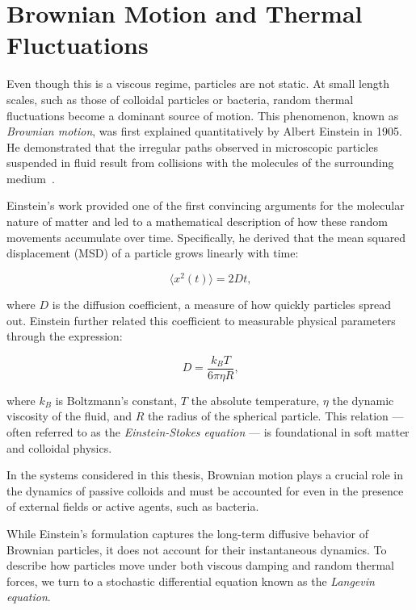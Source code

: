 \section{Brownian Motion and Thermal Fluctuations}
\label{st:brownianmotion}

Even though this is a viscous regime, particles are not static. At small length scales, such as those of colloidal particles or bacteria, random thermal fluctuations become a dominant source of motion. This phenomenon, known as \textit{Brownian motion}, was first explained quantitatively by Albert Einstein in 1905. He demonstrated that the irregular paths observed in microscopic particles suspended in fluid result from collisions with the molecules of the surrounding medium~\cite{einstein1906theory}.

Einstein's work provided one of the first convincing arguments for the molecular nature of matter and led to a mathematical description of how these random movements accumulate over time. Specifically, he derived that the mean squared displacement (MSD) of a particle grows linearly with time:

\begin{equation}
  \langle x^2(t) \rangle = 2Dt\text{,}
  \label{eq:msd}
\end{equation}

where $D$ is the diffusion coefficient, a measure of how quickly particles spread out. Einstein further related this coefficient to measurable physical parameters through the expression:

\begin{equation}
  D = \frac{k_{B}T}{6\pi \eta R}\text{,}
  \label{eq:diffusioncoefficient}
\end{equation}

where $k_B$ is Boltzmann’s constant, $T$ the absolute temperature, $\eta$ the dynamic viscosity of the fluid, and $R$ the radius of the spherical particle. This relation — often referred to as the \textit{Einstein-Stokes equation} — is foundational in soft matter and colloidal physics.

In the systems considered in this thesis, Brownian motion plays a crucial role in the dynamics of passive colloids and must be accounted for even in the presence of external fields or active agents, such as bacteria.

\vspace{1em}

While Einstein’s formulation captures the long-term diffusive behavior of Brownian particles, it does not account for their instantaneous dynamics. To describe how particles move under both viscous damping and random thermal forces, we turn to a stochastic differential equation known as the \textit{Langevin equation}.

